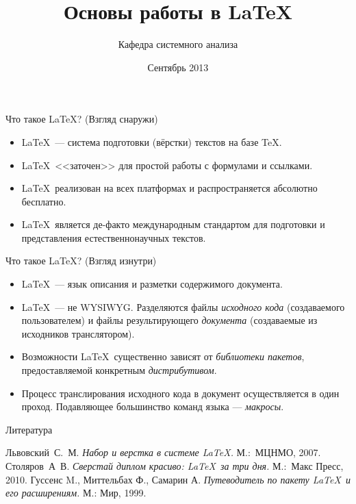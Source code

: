 \documentclass[ucs, mathserif]{beamer}
\title[Первая лекция по \LaTeX]{Основы работы в \LaTeX}
\author[Кафедра СА]{Кафедра системного анализа}
\institute{МГУ им. М.В. Ломоносова \\ Факультет вычислительной математики и кибернетики}
\date{Сентябрь 2013}
\begin{document}
\maketitle
%
%
%
\begin{frame}{Что такое \LaTeX? (Взгляд снаружи)}
\begin{itemize}
 \item \LaTeX\ --- система подготовки (вёрстки) текстов на базе \TeX.
 \item \LaTeX\ <<заточен>> для простой работы с формулами и ссылками.
 \item \LaTeX\ реализован на всех платформах и распространяется абсолютно бесплатно.
 \item \LaTeX\ является де-факто международным стандартом для подготовки и представления естественнонаучных текстов.
\end{itemize}
 
\end{frame}
%
%
%
\begin{frame}{Что такое \LaTeX? (Взгляд изнутри)}
\begin{itemize}
 \item \LaTeX\ --- язык описания и разметки содержимого документа. 
 \item \LaTeX\ --- не WYSIWYG. Разделяются файлы \emph{исходного кода} (создаваемого пользователем) и файлы результирующего \emph{документа} (создаваемые из исходников транслятором).  
 \item Возможности \LaTeX\ существенно зависят от \emph{библиотеки пакетов}, предоставляемой конкретным \emph{дистрибутивом}.
 \item Процесс транслирования исходного кода в документ осуществляется в один проход. Подавляющее большинство команд языка --- \emph{макросы}.
\end{itemize}
 
\end{frame}
%
%
%
\begin{frame}{Литература}
\begin{thebibliography}{99}
  Львовский~С.~М. \emph{Набор и верстка в системе \LaTeX.} М.:~МЦНМО, 2007.
  Столяров~А~В. \emph{Сверстай диплом красиво: \LaTeX\ за три дня.} М.:~Макс Пресс, 2010.
  Гуссенс M., Миттельбах  Ф., Самарин А. \emph{Путеводитель по пакету \LaTeX\ и его расширениям.} М.: Мир, 1999.
\end{thebibliography}
\end{frame}
\end{document}
